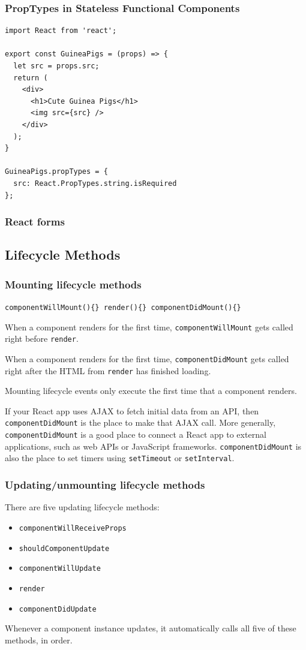 \documentclass[a4paper, 12pt]{article}
\begin{document}
\subsubsection{PropTypes in Stateless Functional Components}
\begin{verbatim}
import React from 'react';

export const GuineaPigs = (props) => {  
  let src = props.src;
  return (
    <div>
      <h1>Cute Guinea Pigs</h1>
      <img src={src} />
    </div>
  );  
}

GuineaPigs.propTypes = {
  src: React.PropTypes.string.isRequired
};
\end{verbatim}

\subsubsection{React forms}


\subsection{Lifecycle Methods}
\subsubsection{Mounting lifecycle methods}
\verb|componentWillMount(){} render(){} componentDidMount(){}|

When a component renders for the first time, \verb|componentWillMount| gets called right before \verb|render|.

When a component renders for the first time, \verb|componentDidMount| gets called right after the HTML from \verb|render| has finished loading.

Mounting lifecycle events only execute the first time that a component renders.

If your React app uses AJAX to fetch initial data from an API, then \verb|componentDidMount| is the place to make that AJAX call. More generally, \verb|componentDidMount| is a good place to connect a React app to external applications, such as web APIs or JavaScript frameworks. \verb|componentDidMount| is also the place to set timers using \verb|setTimeout| or \verb|setInterval|.


\subsubsection{Updating/unmounting lifecycle methods}
There are five updating lifecycle methods:
\begin{itemize}
\item \verb|componentWillReceiveProps|
\item \verb|shouldComponentUpdate|
\item \verb|componentWillUpdate|
\item \verb|render|
\item \verb|componentDidUpdate|
\end{itemize}
Whenever a component instance updates, it automatically calls all five of these methods, in order.
\end{document}
